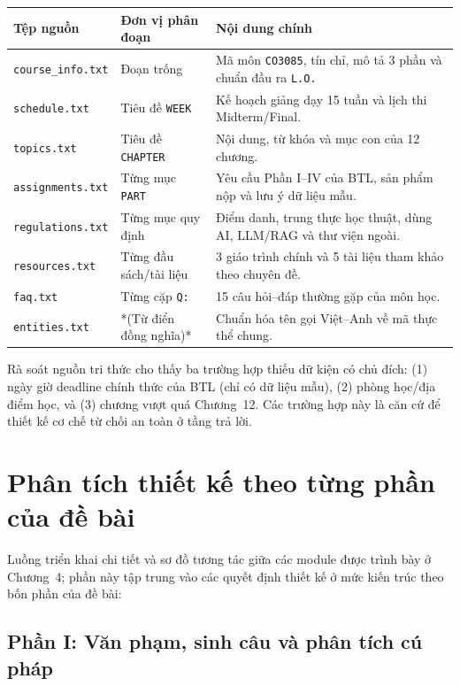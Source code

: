 \begin{longtable}{p{}p{}p{}}
\toprule
Tệp nguồn & Đơn vị phân đoạn & Nội dung chính \\
\midrule
\texttt{course\_info.txt} & Đoạn trống & Mã môn \texttt{CO3085}, tín chỉ, mô tả 3 phần và chuẩn đầu ra \texttt{L.O.} \\
\texttt{schedule.txt} & Tiêu đề \texttt{WEEK} & Kế hoạch giảng dạy 15 tuần và lịch thi Midterm/Final. \\
\texttt{topics.txt} & Tiêu đề \texttt{CHAPTER} & Nội dung, từ khóa và mục con của 12 chương. \\
\texttt{assignments.txt} & Từng mục \texttt{PART} & Yêu cầu Phần I--IV của BTL, sản phẩm nộp và lưu ý dữ liệu mẫu. \\
\texttt{regulations.txt} & Từng mục quy định & Điểm danh, trung thực học thuật, dùng AI, LLM/RAG và thư viện ngoài. \\
\texttt{resources.txt} & Từng đầu sách/tài liệu & 3 giáo trình chính và 5 tài liệu tham khảo theo chuyên đề. \\
\texttt{faq.txt} & Từng cặp \texttt{Q:} & 15 câu hỏi--đáp thường gặp của môn học. \\
\texttt{entities.txt} & *(Từ điển đồng nghĩa)* & Chuẩn hóa tên gọi Việt--Anh về mã thực thể chung. \\
\bottomrule
\end{longtable}

Rà soát nguồn tri thức cho thấy ba trường hợp thiếu dữ kiện có chủ đích: (1) ngày giờ deadline chính thức của BTL (chỉ có dữ liệu mẫu), (2) phòng học/địa điểm học, và (3) chương vượt quá Chương~12. Các trường hợp này là căn cứ để thiết kế cơ chế từ chối an toàn ở tầng trả lời.

\section{Phân tích thiết kế theo từng phần của đề bài}

Luồng triển khai chi tiết và sơ đồ tương tác giữa các module được trình bày ở Chương~4; phần này tập trung vào các quyết định thiết kế ở mức kiến trúc theo bốn phần của đề bài:

\subsection{Phần I: Văn phạm, sinh câu và phân tích cú pháp}

